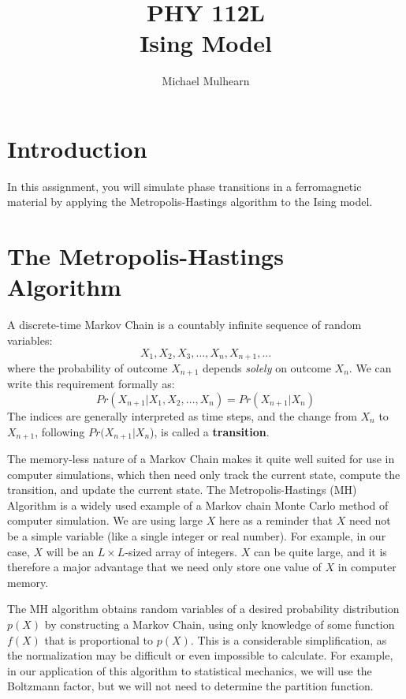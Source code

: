 \documentclass[12pt]{article}
\begin{document}
\title{PHY 112L \\ Ising Model}
\author{Michael Mulhearn}

\maketitle

\section{Introduction}

In this assignment, you will simulate phase transitions in a
ferromagnetic material by applying the Metropolis-Hastings algorithm to
the Ising model.

\section{The Metropolis-Hastings Algorithm}

A discrete-time Markov Chain is a countably infinite sequence of
random variables:
$$X_1, X_2, X_3, \ldots, X_n, X_{n+1}, \ldots$$
where the probability of outcome $X_{n+1}$ depends {\em solely} on
outcome $X_{n}$.  We can write this requirement formally as:
$$Pr(X_{n+1} | X_1, X_2, \ldots, X_{n}) = Pr(X_{n+1}| X_n)$$ The
indices are generally interpreted as time steps, and the change from
$X_n$ to $X_{n+1}$, following $Pr(X_{n+1}|X_{n}$), is called a {\bf
  transition}. 

The memory-less nature of a Markov Chain makes it quite well suited for
use in computer simulations, which then need only track the current
state, compute the transition, and update the current state.  The
Metropolis-Hastings (MH) Algorithm is a widely used example of a
Markov chain Monte Carlo method of computer simulation.  We are using
large $X$ here as a reminder that $X$ need not be a simple variable
(like a single integer or real number).  For example, in our case, $X$
will be an $L \times L$-sized array of integers.  $X$ can be quite
large, and it is therefore a major advantage that we need only store
one value of $X$ in computer memory.

The MH algorithm obtains random variables of a desired probability
distribution $p(X)$ by constructing a Markov Chain, using only
knowledge of some function $f(X)$ that is proportional to $p(X)$.  This
is a considerable simplification, as the normalization may be
difficult or even impossible to calculate.  For example, in our
application of this algorithm to statistical mechanics, we will use
the Boltzmann factor, but we will not need to determine the partition
function.
\end{document}
